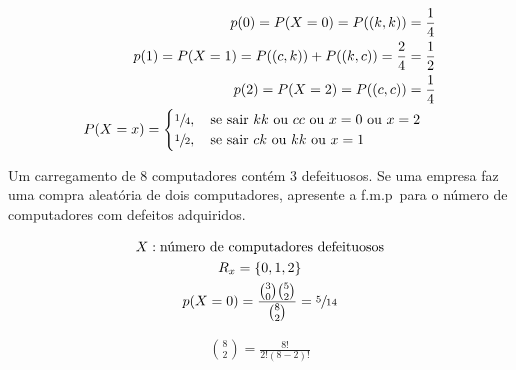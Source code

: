 \begin{description}
\begin{example}
         \begin{align*}
           p(0)=P(X=0)=P((k,k))=\frac{1}{4} \\
           p(1)=P(X=1)=P((c,k))+P((k,c))=\frac{2}{4}=\frac{1}{2}\\
           p(2)=P(X=2)=P((c,c))=\frac{1}{4}\\
           P(X=x)= \begin{cases}
             \sfrac{1}{4}, \text{\quad se sair $kk$ ou $cc$ ou $x=0$ ou $x=2$}\\
             \sfrac{1}{2}, \text{\quad se sair $ck$ ou $kk$ ou $x=1$ }
           \end{cases}
         \end{align*}
       \end{example}
       \begin{example}     Um carregamento de 8 computadores contém 3 defeituosos. Se uma empresa faz uma compra aleatória de dois computadores, apresente a f.m.p\ para o número de computadores com defeitos adquiridos.

         \begin{gather*}   X: \text{número de computadores defeituosos}\\
           R_x = \{0,1,2\} \\
           p(X=0) = \frac{ \tbinom{3}{0} \tbinom{5}{2} }{ \binom{8}{2} }= \sfrac{5}{14}
         \end{gather*}
         \begin{obs}\begin{align*}
           \binom{8}{2} = \frac{8!}{2!\left( 8-2 \right)!}
         \end{align*} 


\end{obs}
\end{example}
\end{description}
